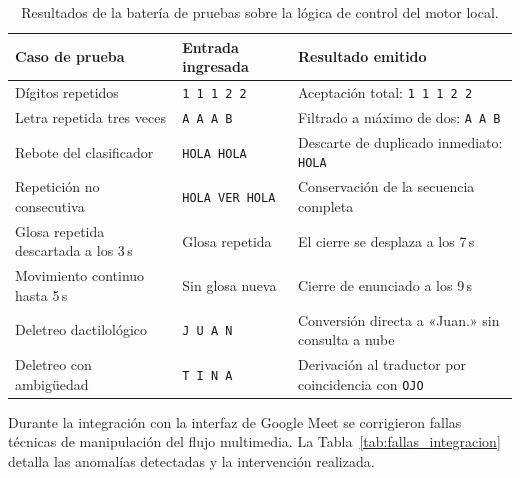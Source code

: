 \begin{table}[H]
    \centering
    \small
    \caption{Resultados de la batería de pruebas sobre la lógica de control del motor local.}
    \label{tab:bateria_logica}
    \begin{tabular}{lll}
        \toprule
        \textbf{Caso de prueba} & \textbf{Entrada ingresada} & \textbf{Resultado emitido} \\
        \midrule
        Dígitos repetidos & \texttt{1 1 1 2 2} & Aceptación total: \texttt{1 1 1 2 2} \\
        Letra repetida tres veces & \texttt{A A A B} & Filtrado a máximo de dos: \texttt{A A B} \\
        Rebote del clasificador & \texttt{HOLA HOLA} & Descarte de duplicado inmediato: \texttt{HOLA} \\
        Repetición no consecutiva & \texttt{HOLA VER HOLA} & Conservación de la secuencia completa \\
        Glosa repetida descartada a los 3\,s & Glosa repetida & El cierre se desplaza a los 7\,s \\
        Movimiento continuo hasta 5\,s & Sin glosa nueva & Cierre de enunciado a los 9\,s \\
        Deletreo dactilológico & \texttt{J U A N} & Conversión directa a «Juan.» sin consulta a nube \\
        Deletreo con ambigüedad & \texttt{T I N A} & Derivación al traductor por coincidencia con \texttt{OJO} \\
        \bottomrule
    \end{tabular}
\end{table}

Durante la integración con la interfaz de Google Meet se corrigieron fallas técnicas de manipulación del flujo multimedia. La Tabla~\ref{tab:fallas_integracion} detalla las anomalías detectadas y la intervención realizada.

